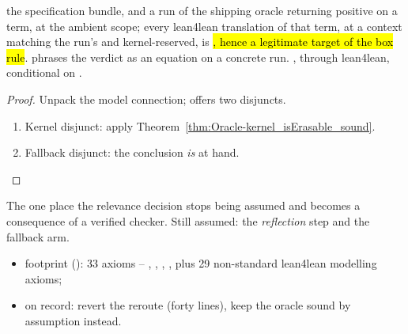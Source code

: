 \begin{theorem}
\label{thm:ErasureSpec-oracle_sound_of_run}
\leanok
{} the specification bundle, and a run of the shipping oracle returning positive on a
term, at the ambient scope;
 every lean4lean translation of that term, at a context matching the run's and
kernel-reserved, is \hl{\Erasable{}, hence a legitimate target of the box rule}.
 phrases the verdict as an equation on a concrete  run.
 \stProved{}, \stInherited{} through lean4lean, conditional on \stAssumed{}
.
\end{theorem}
\begin{proof}
\leanok
{}
 Unpack the model connection;  offers two disjuncts.
\begin{enumerate}
\item Kernel disjunct: apply Theorem~\ref{thm:Oracle-kernel_isErasable_sound}.
\item Fallback disjunct: the conclusion \emph{is}  at hand.
\end{enumerate}
\end{proof}

\begin{remark}
 The one place the relevance decision stops being assumed and becomes a consequence of a
verified checker. Still assumed: the \emph{reflection} step and the fallback arm.
\begin{itemize}
\item footprint (): 33 axioms -- , ,
, , plus 29 non-standard lean4lean modelling axioms;
\item on record: revert the reroute (forty lines), keep the oracle sound by assumption instead.
\end{itemize}
\end{remark}

